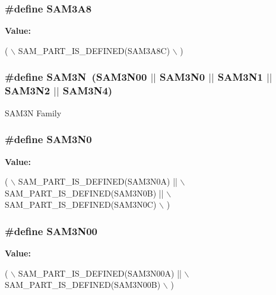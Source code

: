 \subsubsection[{S\+A\+M3\+A8}]{\setlength{\rightskip}{0pt plus 5cm}\#define S\+A\+M3\+A8}\label{group__sam__part__macros__group_gab1397a5e346af96e5ed34027ed3b4de8}
{\bfseries Value\+:}
\begin{DoxyCode}
( \(\backslash\)
        SAM\_PART\_IS\_DEFINED(SAM3A8C) \(\backslash\)
        )
\end{DoxyCode}
\hypertarget{group__sam__part__macros__group_ga52239420b96aa3f1a273665cfd3b60a1}{}
\subsubsection[{S\+A\+M3\+N}]{\setlength{\rightskip}{0pt plus 5cm}\#define S\+A\+M3\+N~(S\+A\+M3\+N00 $\vert$$\vert$ S\+A\+M3\+N0 $\vert$$\vert$ S\+A\+M3\+N1 $\vert$$\vert$ S\+A\+M3\+N2 $\vert$$\vert$ S\+A\+M3\+N4)}\label{group__sam__part__macros__group_ga52239420b96aa3f1a273665cfd3b60a1}
S\+A\+M3\+N Family \hypertarget{group__sam__part__macros__group_ga6a5ed34ed428558ee2bb94af5ae516d6}{}
\subsubsection[{S\+A\+M3\+N0}]{\setlength{\rightskip}{0pt plus 5cm}\#define S\+A\+M3\+N0}\label{group__sam__part__macros__group_ga6a5ed34ed428558ee2bb94af5ae516d6}
{\bfseries Value\+:}
\begin{DoxyCode}
( \(\backslash\)
        SAM\_PART\_IS\_DEFINED(SAM3N0A) || \(\backslash\)
        SAM\_PART\_IS\_DEFINED(SAM3N0B) || \(\backslash\)
        SAM\_PART\_IS\_DEFINED(SAM3N0C) \(\backslash\)
        )
\end{DoxyCode}
\hypertarget{group__sam__part__macros__group_gab650d285e2a8ff0d85b3522c87a4cfc6}{}
\subsubsection[{S\+A\+M3\+N00}]{\setlength{\rightskip}{0pt plus 5cm}\#define S\+A\+M3\+N00}\label{group__sam__part__macros__group_gab650d285e2a8ff0d85b3522c87a4cfc6}
{\bfseries Value\+:}
\begin{DoxyCode}
( \(\backslash\)
        SAM\_PART\_IS\_DEFINED(SAM3N00A) ||    \(\backslash\)
        SAM\_PART\_IS\_DEFINED(SAM3N00B) \(\backslash\)
        )
\end{DoxyCode}
\hypertarget{group__sam__part__macros__group_gaf58a7d141f31d6db97223dfd62d92905}{}
